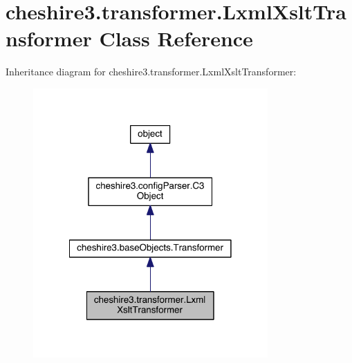 \hypertarget{classcheshire3_1_1transformer_1_1_lxml_xslt_transformer}{\section{cheshire3.\-transformer.\-Lxml\-Xslt\-Transformer Class Reference}
\label{classcheshire3_1_1transformer_1_1_lxml_xslt_transformer}
}


Inheritance diagram for cheshire3.\-transformer.\-Lxml\-Xslt\-Transformer\-:
\nopagebreak
\begin{figure}[H]
\begin{center}
\leavevmode
\includegraphics[width=254pt]{classcheshire3_1_1transformer_1_1_lxml_xslt_transformer__inherit__graph}
\end{center}
\end{figure}


